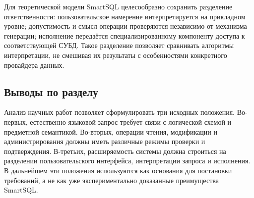 Для теоретической модели SmartSQL целесообразно сохранить разделение ответственности: пользовательское намерение интерпретируется на прикладном уровне; допустимость и смысл операции проверяются независимо от механизма генерации; исполнение передаётся специализированному компоненту доступа к соответствующей СУБД. Такое разделение позволяет сравнивать алгоритмы интерпретации, не смешивая их результаты с особенностями конкретного провайдера данных.

\subsection{Выводы по разделу}

Анализ научных работ позволяет сформулировать три исходных положения. Во-первых, естественно-языковой запрос требует связи с логической схемой и предметной семантикой. Во-вторых, операции чтения, модификации и администрирования должны иметь различные режимы проверки и подтверждения. В-третьих, расширяемость системы должна строиться на разделении пользовательского интерфейса, интерпретации запроса и исполнения. В дальнейшем эти положения используются как основания для постановки требований, а не как уже экспериментально доказанные преимущества SmartSQL.